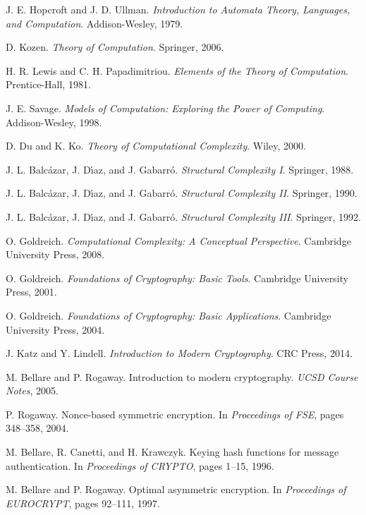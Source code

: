 \documentclass[11pt]{article}
\theoremstyle{plain}
\theoremstyle{definition}
\begin{document}
\begin{thebibliography}{99}
 J. E. Hopcroft and J. D. Ullman. \emph{Introduction to Automata Theory, Languages, and Computation}. Addison-Wesley, 1979.

 D. Kozen. \emph{Theory of Computation}. Springer, 2006.

 H. R. Lewis and C. H. Papadimitriou. \emph{Elements of the Theory of Computation}. Prentice-Hall, 1981.

 J. E. Savage. \emph{Models of Computation: Exploring the Power of Computing}. Addison-Wesley, 1998.

 D. Du and K. Ko. \emph{Theory of Computational Complexity}. Wiley, 2000.

 J. L. Balc\'azar, J. D\'{\i}az, and J. Gabarr\'o. \emph{Structural Complexity I}. Springer, 1988.

 J. L. Balc\'azar, J. D\'{\i}az, and J. Gabarr\'o. \emph{Structural Complexity II}. Springer, 1990.

 J. L. Balc\'azar, J. D\'{\i}az, and J. Gabarr\'o. \emph{Structural Complexity III}. Springer, 1992.

 O. Goldreich. \emph{Computational Complexity: A Conceptual Perspective}. Cambridge University Press, 2008.

 O. Goldreich. \emph{Foundations of Cryptography: Basic Tools}. Cambridge University Press, 2001.

 O. Goldreich. \emph{Foundations of Cryptography: Basic Applications}. Cambridge University Press, 2004.

 J. Katz and Y. Lindell. \emph{Introduction to Modern Cryptography}. CRC Press, 2014.

 M. Bellare and P. Rogaway. Introduction to modern cryptography. \emph{UCSD Course Notes}, 2005.

 P. Rogaway. Nonce-based symmetric encryption. In \emph{Proceedings of FSE}, pages 348--358, 2004.

 M. Bellare, R. Canetti, and H. Krawczyk. Keying hash functions for message authentication. In \emph{Proceedings of CRYPTO}, pages 1--15, 1996.

 M. Bellare and P. Rogaway. Optimal asymmetric encryption. In \emph{Proceedings of EUROCRYPT}, pages 92--111, 1997.


\end{thebibliography}
\end{document}
